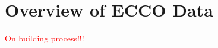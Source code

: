 \pagebreak
\section{Overview of ECCO Data}

\begin{center}
    \textcolor{red}{\Large{On building process!!!}}
    \end{center}

